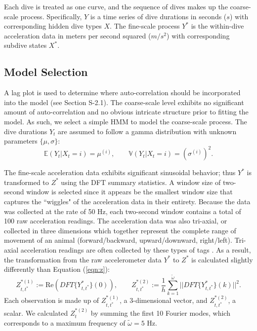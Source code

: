 Each dive is treated as one curve, and the sequence of dives makes up the coarse-scale process. Specifically, $Y$ is a time series of dive durations in seconds ($s$) with corresponding hidden dive types $X$. The fine-scale process $Y^*$ is the within-dive acceleration data in meters per second squared ($m/s^2$) with corresponding subdive states $X^*$.

\subsection{Model Selection}

A lag plot is used to determine where auto-correlation should be incorporated into the model (see Section S-2.1). The coarse-scale level exhibits no significant amount of auto-correlation and no obvious intricate structure prior to fitting the model. As such, we select a simple HMM to model the coarse-scale process. The dive durations $Y_t$ are assumed to follow a gamma distribution with unknown parameters $\{\mu,\sigma\}$:
%
$$\mathbb{E}(Y_t|X_t = i) = \mu^{(i)}, \qquad \mathbb{V}(Y_t|X_t = i) = \left(\sigma^{(i)}\right)^2.$$

The fine-scale acceleration data exhibits significant sinusoidal behavior; thus $Y^*$ is transformed to $Z^*$ using the DFT summary statistics. A window size of two-second window is selected since it appears be the smallest window size that captures the ``wiggles" of the acceleration data in their entirety. Because the data was collected at the rate of 50 Hz, each two-second window contains a total of 100 raw acceleration readings. The acceleration data was also tri-axial, or collected in three dimensions which together represent the complete range of movement of an animal (forward/backward, upward/downward, right/left). Tri-axial acceleration readings are often collected by these types of tags \citep{Cade:2017,Fehlmann:2017,Wright:2017}. As a result, the transformation from the raw accelerometer data $Y^*$ to $Z^*$ is calculated slightly differently than Equation (\ref{eqn:z}):
%
\begin{equation*}
    Z_{t,t^*}^{*(1)} := \text{Re}\left(DFT\{Y^*_{t,t^*}\}(0)\right), \qquad Z_{t,t^*}^{*(2)} := \frac{1}{h}\sum_{k=1}^{\tilde{\omega}}\bigg|\bigg|DFT\{Y^*_{t,t^*}\}(k)\bigg|\bigg|^2.
\end{equation*}
%
Each observation is made up of $Z_{t,t^*}^{*(1)}$, a 3-dimensional vector, and $Z_{t,t^*}^{*(2)}$, a scalar. We calculated $Z_t^{*(2)}$ by summing the first 10 Fourier modes, which corresponds to a maximum frequency of $\tilde \omega = 5$ Hz. 

